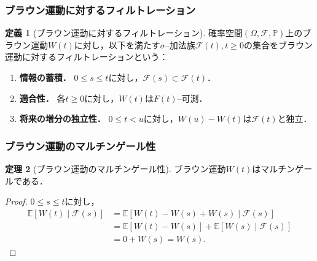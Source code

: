 \documentclass[a4paper, lualatex, ja=standard]{bxjsarticle}
\theoremstyle{definition}
\newtheorem{thm}{定理}
\newtheorem{dfn}[thm]{定義}
\begin{document}
\subsubsection{ブラウン運動に対するフィルトレーション}
\begin{dfn}[ブラウン運動に対するフィルトレーション]
  確率空間$(\Omega,\mathcal{F},\mathbb{P})$上のブラウン運動$W(t)$に対し，以下を満たす$\sigma$--加法族$\mathcal{F}(t),t\geq0$の集合をブラウン運動に対するフィルトレーションという：
  \begin{enumerate}
    \item \textbf{情報の蓄積．}
    $0\leq s\leq t$に対し，$\mathcal{F}(s)\subset\mathcal{F}(t)$．
    \item \textbf{適合性．}
    各$t\geq0$に対し，$W(t)$は$F(t)$--可測．
    \item \textbf{将来の増分の独立性．}
    $0\leq t<u$に対し，$W(u)-W(t)$は$\mathcal{F}(t)$と独立．
  \end{enumerate}
\end{dfn}

\subsubsection{ブラウン運動のマルチンゲール性}
\begin{thm}[ブラウン運動のマルチンゲール性]
  ブラウン運動$W(t)$はマルチンゲールである．
\end{thm}
\begin{proof}
  $0\leq s\leq t$に対し，
  \begin{align*}
    \mathbb{E}[W(t)\mid\mathcal{F}(s)] 
    &= \mathbb{E}[W(t)-W(s)+W(s)\mid\mathcal{F}(s)] \\
    &= \mathbb{E}[W(t)-W(s)] + \mathbb{E}[W(s)\mid\mathcal{F}(s)] \\
    &= 0 + W(s) = W(s).
  \end{align*}
\end{proof}
\end{document}

